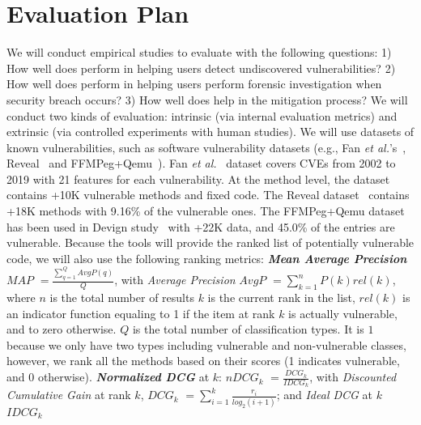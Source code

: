 \section{Evaluation Plan}
\label{eval}

We will conduct empirical studies to evaluate {\tool} with the
following questions: 1) How well does {\tool} perform in
helping users detect undiscovered vulnerabilities? 2) How well does
{\tool} perform in helping users perform forensic investigation when
security breach occurs? 3) How well does {\tool} help in the
mitigation process? We will conduct two kinds of evaluation: intrinsic
(via internal evaluation metrics) and extrinsic (via controlled
experiments with human studies). We will use datasets of known
vulnerabilities, such as software vulnerability datasets (e.g., Fan
{\em et al.}'s~\cite{fan2020msr}, Reveal~\cite{chakraborty2020deep}
and FFMPeg+Qemu~\cite{zhou2019devign}).  Fan {\em et
  al.}~\cite{fan2020msr} dataset covers CVEs from 2002 to 2019 with 21
features for each vulnerability.  At the method level, the dataset
contains +10K vulnerable methods and fixed code. The Reveal
dataset~\cite{chakraborty2020deep} contains +18K methods with 9.16\%
of the vulnerable ones. The FFMPeg+Qemu dataset has been used in
Devign study~\cite{zhou2019devign} with +22K data, and 45.0\% of the
entries are vulnerable.
Because the tools will
provide the ranked list of potentially vulnerable code, we will also
use the following ranking metrics: {\bf {\em Mean Average Precision}}
$MAP$ $=\frac{\sum_{q=1}^{Q}AvgP(q)}{Q}$, with {\em Average Precision}
$AvgP$ $=\sum_{k=1}^{n}P(k)rel(k)$,
%
where $n$ is the total number of results $k$ is the current rank in
the list, $rel(k)$ is an indicator function equaling to 1 if the item
at rank $k$ is actually vulnerable, and to zero otherwise. $Q$ is the
total number of classification types. It is $1$ because we only have
two types including vulnerable and non-vulnerable classes, however, we
rank all the methods based on their scores (1 indicates vulnerable,
and 0 otherwise).
%
{\bf {\em Normalized DCG}} at $k$: {\bf $nDCG_k$}
$=\frac{DCG_k}{IDCG_k}$, with {\em Discounted Cumulative Gain} at rank
$k$, $DCG_k$ $=\sum_{i=1}^{k}\frac{r_i}{log_2(i+1)}$; and {\em Ideal
DCG} at $k$ $IDCG_k$
